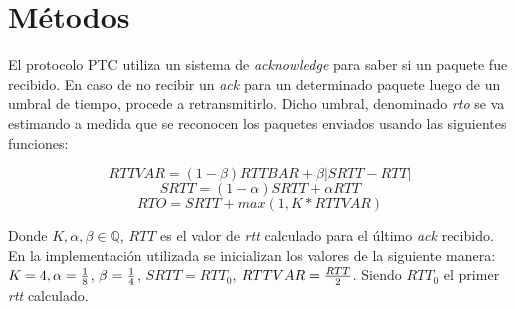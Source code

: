 \section{M\'etodos}
    
    El protocolo PTC utiliza un sistema de \textit{acknowledge} para
    saber si un paquete fue recibido. En caso de no recibir un \textit{ack}
    para un  determinado paquete luego de un umbral de tiempo, procede a
    retransmitirlo. Dicho umbral, denominado \textit{rto} se va estimando
    a medida que se reconocen los paquetes enviados usando las 
    siguientes funciones: 
    
        $$RTTVAR = (1-\beta)RTTBAR + \beta |SRTT-RTT|$$
        $$SRTT = (1-\alpha)SRTT + \alpha RTT$$
        $$RTO = SRTT + max( 1, K * RTTVAR) $$ 
        
    Donde $K, \alpha, \beta \in \mathbb{Q}$, $RTT$ es el valor de 
    \textit{rtt} calculado para el \'ultimo \textit{ack} recibido. 
    En la implementaci\'on utilizada se inicializan los valores de la
    siguiente manera: $K = 4, \alpha={{1}\over{8}}$,
    $\beta={{1}\over{4}}$, $SRTT={RTT_0}$, $RTTVAR={{RTT}\over{2}}$.
    Siendo $RTT_0$ el primer \textit{rtt} calculado.
    
    
